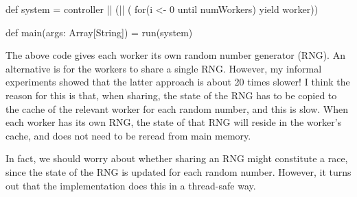 \begin{answerS}
\begin{scala}
{  def system = controller || (|| ( for(i <- 0 until numWorkers) yield worker))

  def main(args: Array[String]) = run(system)
}

\end{scala}

The above code gives each worker its own random number generator (RNG).  An
alternative is for the workers to share a single RNG.  However, my informal
experiments showed that the latter approach is about 20 times slower!  I think
the reason for this is that, when sharing, the state of the RNG has to be
copied to the cache of the relevant worker for each random number, and this is
slow.  When each worker has its own RNG, the state of that RNG will reside in
the worker's cache, and does not need to be reread from main memory.  

In fact, we should worry about whether sharing an RNG might constitute a race,
since the state of the RNG is updated for each random number.  However, it
turns out that the implementation does this in a thread-safe way.
\end{answerS}



